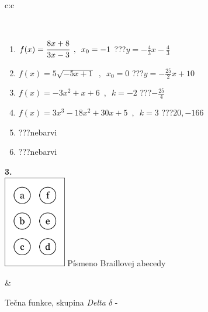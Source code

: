 \documentclass[10pt]{report}
\begin{document}
\begin{tabular}{c:c}
\begin{minipage}[c][104.5mm][t]{0.5\linewidth}
\begin{center}
\begin{minipage}{0.95\linewidth}
\begin{center}
\end{center}
\end{minipage}
\\[1mm]
\begin{minipage}{0.79\linewidth}
\begin{center}
\begin{varwidth}{\linewidth}
\begin{enumerate}
\small
\item $f(x)=\cfrac{8x+8}{3x-3}\enspace , \enspace x_0=-1$\quad \dotfill\; ???\;\dotfill \quad $y = -\frac{4}{3}x-\frac{4}{3}$
\item $f(x)=5\sqrt{-5x+1}\enspace , \enspace x_0=0$\quad \dotfill\; ???\;\dotfill \quad $y = -\frac{25}{2}x+10$
\item $f(x)=-3x^2+x+6\enspace , \enspace k=-2$\quad \dotfill\; ???\;\dotfill \quad $-\frac{25}{4}$
\item $f(x)=3x^3-18x^2+30x+5\enspace , \enspace k=3$\quad \dotfill\; ???\;\dotfill \quad $20 , -166$
\item \quad \dotfill\; ???\;\dotfill \quad nebarvi
\item \quad \dotfill\; ???\;\dotfill \quad nebarvi
\end{enumerate}
\end{varwidth}
\end{center}
\end{minipage}
\begin{minipage}{0.20\linewidth}
\begin{center}
{\Huge\bfseries 3.} \\[2mm]
\includegraphics[height=40mm]{../images/braille.png}
{\small Písmeno Braillovej abecedy}
\end{center}
\end{minipage}
\end{center}
\end{minipage}
&
\begin{minipage}[c][104.5mm][t]{0.5\linewidth}
\begin{center}
\vspace{7mm}
{\huge Tečna funkce, skupina \textit{Delta $\delta$} -}\\[5mm]

\end{center}
\end{minipage}
\end{tabular}
\end{document}
